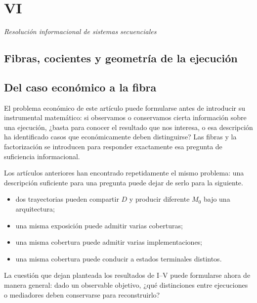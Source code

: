 \documentclass[10pt,a5paper,twoside]{article}
\providecommand{\tightlist}{\setlength{\itemsep}{0pt}\setlength{\parskip}{0pt}}
\begin{document}
\cleardoublepage
\setcounter{subsection}{0}
\vspace*{6mm}\section*{VI}\label{vi.-resoluciuxf3n-informacional-de-sistemas-secuenciales}
\thispagestyle{plain}
{\large\itshape Resolución informacional de sistemas secuenciales\par}\vspace{1.2ex}

\subsection*{Fibras, cocientes y geometría de la ejecución}\label{fibras-cocientes-y-geometruxeda-de-la-ejecuciuxf3n}

\subsection{Del caso económico a la fibra}\label{del-caso-econuxf3mico-a-la-fibra}

El problema económico de este artículo puede formularse antes de introducir su
instrumental matemático: si observamos o conservamos cierta información sobre una
ejecución, ¿basta para conocer el resultado que nos interesa, o esa descripción ha
identificado casos que económicamente deben distinguirse? Las fibras y la factorización
se introducen para responder exactamente esa pregunta de suficiencia informacional.

Los artículos anteriores han encontrado repetidamente el mismo problema:
una descripción suficiente para una pregunta puede dejar de serlo para la
siguiente.

\begin{itemize}
\tightlist
\item
  dos trayectorias pueden compartir \(D\) y producir diferente \(M_0\)
  bajo una arquitectura;
\item
  una misma exposición puede admitir varias coberturas;
\item
  una misma cobertura puede admitir varias implementaciones;
\item
  una misma cobertura puede conducir a estados terminales distintos.
\end{itemize}

La cuestión que dejan planteada los resultados de I--V puede formularse ahora de manera general: dado un observable objetivo, ¿qué distinciones entre ejecuciones o mediadores deben conservarse para reconstruirlo?
\end{document}
